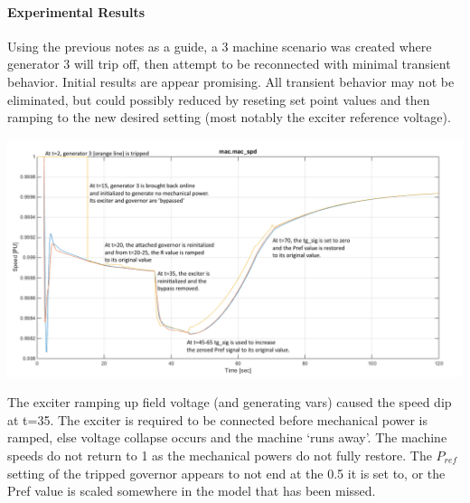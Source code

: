 \documentclass[12pt]{article}
\begin{document}
\pagebreak
\begin{landscape}

\paragraph{Experimental Results}
Using the previous notes as a guide, a 3 machine scenario was created where generator 3 will trip off, then attempt to be reconnected with minimal transient behavior.
Initial results are appear promising.
All transient behavior may not be eliminated, but could possibly reduced by reseting set point values and then ramping to the new desired setting (most notably the exciter reference voltage).
\begin{center}
\includegraphics[width=.95\linewidth]{machineSpeedsNotes}
\end{center}

The exciter ramping up field voltage (and generating vars) caused the speed dip at t=35.
The exciter is required to be connected before mechanical power is ramped, else voltage collapse occurs and the machine `runs away'.
The machine speeds do not return to 1 as the mechanical powers do not fully restore.
The $P_{ref}$ setting of the tripped governor appears to not end at the 0.5 it is set to, or the Pref value is scaled somewhere in the model that has been missed.
\end{landscape}
\end{document}
